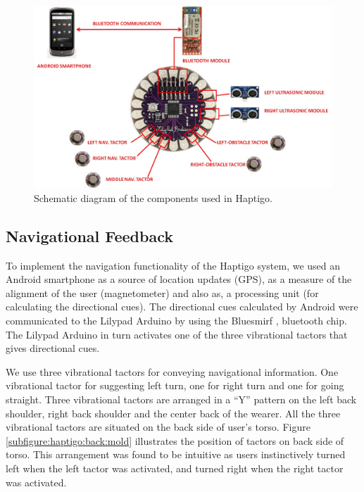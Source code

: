\documentclass{sigchi}
\begin{document}
\begin{figure}[ht]
\centering
\includegraphics[width=0.9\columnwidth]{Images/Complete_System_Diagram.jpg}
\caption{Schematic diagram of the components used in Haptigo.}
\label{fig:haptigoschematic}
\end{figure}

\subsection{Navigational Feedback}
To implement the navigation functionality of the Haptigo system, we used an Android smartphone \cite{Android} as a source of location updates (GPS), as a measure of the alignment of the user (magnetometer) and also as, a processing unit (for calculating the directional cues). The directional cues calculated by Android \cite{Android} were communicated to the Lilypad Arduino \cite{Arduino} by using the Bluesmirf \cite{BlueSmirf}, bluetooth chip. The Lilypad Arduino \cite{Arduino} in turn activates one of the three vibrational tactors that gives directional cues.

We use three vibrational tactors for conveying navigational information. One vibrational tactor for suggesting left turn, one for right turn and one for going straight.  Three vibrational tactors are arranged in a “Y” pattern on the left back shoulder, right back shoulder and the center back of the wearer. All the three vibrational tactors are situated on the back side of user’s torso. Figure \ref{subfigure:haptigo:back:mold} illustrates the position of tactors on back side of torso. This arrangement was found to be intuitive as users instinctively turned left when the left tactor was activated, and turned right when the right tactor was activated.
\end{document}
